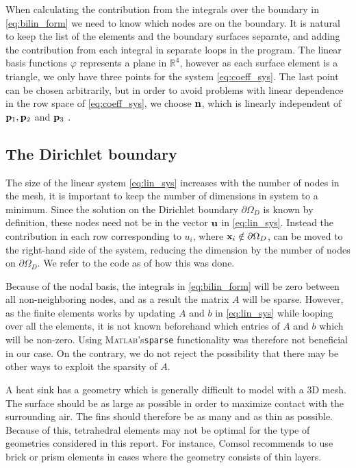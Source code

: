When calculating the contribution from the integrals over the boundary in \eqref{eq:bilin_form} we need to know which nodes are on the boundary. It is natural to keep the list of the elements and the boundary surfaces separate, and adding the contribution from each integral in separate loops in the program. The linear basis functions $\varphi$ represents a plane in $\mathbb{R}^4$, however as each surface element is a triangle, we only have three points for the system \eqref{eq:coeff_sys}. The last point can be chosen arbitrarily, but in order to avoid problems with linear dependence in the row space of \eqref{eq:coeff_sys}, we choose $\vb{n}$, which is linearly independent of $\vb{p}_1,\vb{p}_2$ and $\vb{p}_3$ .

\subsection{The Dirichlet boundary}
 The size of the linear system \eqref{eq:lin_sys} increases with the number of nodes in the mesh, it is important to keep the number of dimensions in system to a minimum. Since the solution on the Dirichlet boundary $\partial\Omega_D$ is known by definition, these nodes need not be in the vector $\vb{u}$ in \eqref{eq:lin_sys}. Instead the contribution in each row corresponding to $u_i$, where $\vb{x}_i \notin \partial\Omega_D$, can be moved to the right-hand side of the system, reducing the dimension by the number of nodes on $\partial\Omega_D$. We refer to the code as of how this was done.

 Because of the nodal basis, the integrals in \eqref{eq:bilin_form} will be zero between all non-neighboring nodes, and as a result the matrix $A$ will be sparse. However, as the finite elements works by updating $A$ and $b$ in \eqref{eq:lin_sys} while looping over all the elements, it is not known beforehand which entries of $A$ and $b$ which will be non-zero. Using \textsc{Matlab}'s\xspace \texttt{sparse} functionality was therefore not beneficial in our case. On the contrary, we do not reject the possibility that there may be other ways to exploit the sparsity of $A$.

 A heat sink has a geometry which is generally difficult to model with a 3D mesh. The surface should be as large as possible in order to maximize contact with the surrounding air. The fins should therefore be as many and as thin as possible. Because of this, tetrahedral elements may not be optimal for the type of geometries considered in this report. For instance, Comsol \cite{comsol_mesh_types} recommends to use brick or prism elements in cases where the geometry consists of thin layers.


